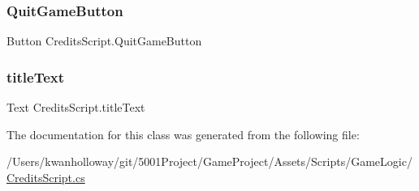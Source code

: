\mbox{\label{class_credits_script_abe48b2113f4170b2ecd121d3476617e7}} 
\subsubsection{\texorpdfstring{Quit\+Game\+Button}{QuitGameButton}}
{\footnotesize\ttfamily Button Credits\+Script.\+Quit\+Game\+Button}

\mbox{\label{class_credits_script_a82dd5ac0339aa56110dd0e0950a0c4c5}} 
\subsubsection{\texorpdfstring{title\+Text}{titleText}}
{\footnotesize\ttfamily Text Credits\+Script.\+title\+Text}



The documentation for this class was generated from the following file\+:\begin{DoxyCompactItemize}
\item 
/\+Users/kwanholloway/git/5001\+Project/\+Game\+Project/\+Assets/\+Scripts/\+Game\+Logic/\hyperlink{_credits_script_8cs}{Credits\+Script.\+cs}\end{DoxyCompactItemize}
